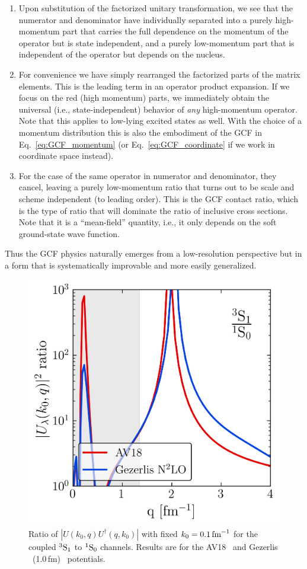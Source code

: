 \documentclass[10pt,aps,prc,floatfix,twocolumn,nofootinbib]{revtex4-1}
\begin{document}
\begin{enumerate}
    \item Upon substitution of the factorized unitary transformation, we see that the numerator and denominator have individually separated into a purely high-momentum part that carries the full dependence on the momentum of the operator but is state independent, and a purely low-momentum part that is independent of the operator but depends on the nucleus.
    
    \item For convenience we have simply rearranged the factorized parts of the matrix elements.
    This is the leading term in an operator product expansion.
    If we focus on the red (high momentum) parts, we immediately obtain the universal (i.e., state-independent) behavior of \emph{any} high-momentum operator. Note that this applies to low-lying excited states as well.
    With the choice of a momentum distribution this is also the embodiment of 
    the GCF in Eq.~\eqref{eq:GCF_momentum} (or Eq.~\eqref{eq:GCF_coordinate} if we work in coordinate space instead).
    
    \item
    For the case of the same operator in numerator and denominator, they cancel, leaving a purely low-momentum ratio that turns out to be scale and scheme independent (to leading order).
    This is the GCF contact ratio, which is the type of ratio that will dominate the ratio of inclusive cross sections.
    Note that it is a ``mean-field'' quantity, i.e., it only depends on the soft ground-state wave function.
\end{enumerate}
%
Thus the GCF physics naturally emerges from a low-resolution perspective but in a form that is systematically improvable and more easily generalized.

\begin{figure}[tbh]
  \centering
  \includegraphics[width=0.7\columnwidth]{figures_low_res/srg_transformation_ratios_k0_0p1_lamb_1p35_kvnns_6_222_kmax_15p0.png}
  \caption{Ratio of $|U(k_0,q)U^\dagger(q,k_0)|$ with fixed $k_0 = 0.1\,\mbox{fm}^{-1}$ for the coupled $^3\mbox{S}_1$ to $^1\mbox{S}_0$ channels.
  Results are for the AV18~\cite{Wiringa:1994wb} and Gezerlis \NNLO\ (1.0\,fm)~\cite{Gezerlis:2014zia} potentials.}
  \label{fig:ratio_1p35_kvnn_6_222}
\end{figure}
\end{document}
